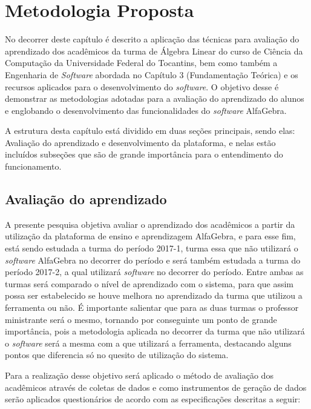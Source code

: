 \chapter{Metodologia Proposta}
\label{cap:metodologia}

\noindent No decorrer deste capítulo é descrito a aplicação das técnicas para avaliação do aprendizado dos acadêmicos da turma de Álgebra Linear do curso de Ciência da Computação da Universidade Federal do Tocantins, bem como também a Engenharia de \textit{Software} abordada no Capítulo 3 (Fundamentação Teórica) e os recursos aplicados para o desenvolvimento do \textit{software}. O objetivo desse é demonstrar as metodologias adotadas para a avaliação do aprendizado do alunos e englobando o desenvolvimento das funcionalidades do \textit{software} AlfaGebra. 

A estrutura desta capítulo está dividido em duas seções principais, sendo elas: Avaliação do aprendizado e desenvolvimento da plataforma, e nelas estão incluídos subseções que são de grande importância para o entendimento do funcionamento.

\section{Avaliação do aprendizado}
\noindent A presente pesquisa objetiva avaliar o aprendizado dos acadêmicos a partir da utilização da plataforma de ensino e aprendizagem AlfaGebra, e para esse fim, está sendo estudada a turma do período 2017-1, turma essa que não utilizará o \textit{software} AlfaGebra no decorrer do período e será também estudada a turma do período 2017-2, a qual utilizará \textit{software} no decorrer do período. Entre ambas as turmas será comparado o nível de aprendizado com o sistema, para que assim possa ser estabelecido se houve melhora no aprendizado da turma que utilizou a ferramenta ou não. É importante salientar que para as duas turmas o professor ministrante será o mesmo, tornando por conseguinte um ponto de grande importância, pois a metodologia aplicada no decorrer da turma que não utilizará o \textit{software} será a mesma com a que utilizará a ferramenta, destacando alguns pontos que diferencia só no quesito de utilização do sistema.

Para a realização desse objetivo será aplicado o método de avaliação dos acadêmicos através de coletas de dados e como instrumentos de geração de dados serão aplicados questionários de acordo com as especificações descritas a seguir:


